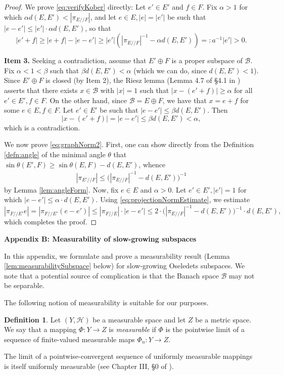 \documentclass[11pt]{amsart}
\theoremstyle{theorem}
\theoremstyle{definition}
\newtheorem{defn}[thm]{Definition}
\numberwithin{equation}{section}
\renewcommand{\a}{\alpha}
\newcommand{\Bc}{\mathcal{B}}
\newcommand{\ds}{/ \! /}
\begin{document}
\begin{proof}
We prove \eqref{eq:verifyKober} directly: Let $e' \in E'$ and $f \in F$.
Fix $\a > 1$ for which $\a d(E, E') < |\pi_{E \ds F}|$, and let $e \in E, |e|  = |e'|$ be 
such that $|e - e'| \leq |e'| \cdot  \a d(E, E')$, so that
\[
|e' + f| \geq |e + f| - |e - e'| \geq |e'| (|\pi_{E \ds F}|^{-1} - \a d(E, E')) =: a^{-1} |e'| > 0 .
\]

\smallskip \noindent
{\bf Item 3.} Seeking a contradiction, assume that $E' \oplus F$ is a proper subspace of $\Bc$. Fix $\a < 1 < \beta$ such that $\beta d(E, E') < \a$ (which we can do, since $d(E, E') < 1$). Since $E' \oplus F$ is closed (by Item 2), the Riesz lemma (Lemma 4.7 of \S 4.1 in \cite{S}) asserts that there exists $x \in \Bc$ with $|x|=1$ such that $|x -  (e' + f)| \geq \a$ for all $e' \in E', f \in F$. On the other hand, since $\Bc = E \oplus F$, we have that $x = e + f$ for some $e \in E, f \in F$. Let $e' \in E'$ be such that $|e - e'| \leq \beta d(E, E')$. Then
\[
|x - (e' + f)| = |e - e'| \leq \beta d(E, E') < \a,
\]
which is a contradiction.

We now prove \eqref{eq:graphNorm2}. First, one can show directly from the Definition \ref{defn:angle} of the minimal angle $\theta$ that $\sin \theta(E', F) \geq \sin \theta(E, F) - d(E, E')$, whence
\begin{align}\label{eq:projectionNormEstimate}
|\pi_{E' \ds F}| \leq \big( |\pi_{E \ds F}|^{-1} - d(E, E')\big)^{-1}
\end{align}
by Lemma \ref{lem:angleForm}. Now, fix $e \in E$ and $\a > 0$. Let $e' \in E', |e'| = 1$ for which $|e - e'| \leq \a \cdot d(E, E')$. Using \eqref{eq:projectionNormEstimate}, we estimate
\[
|\pi_{F \ds E'} e| = |\pi_{F \ds E'} (e - e')| \leq |\pi_{F \ds E}| \cdot |e - e'| \leq 2 \cdot \big( |\pi_{E \ds F}|^{-1} - d(E, E')\big)^{-1} \cdot d(E, E'),
\]
which completes the proof.
\end{proof}

\begin{center}
{\bf Appendix B: Measurability of slow-growing subspaces}
\end{center}

In this appendix, we formulate and prove a measurability result (Lemma \ref{lem:measurabilitySubspace} below) for slow-growing Oseledets subspaces. We note that a potential source of complication is that the Banach space $\Bc$ may not be separable.

\medskip

The following notion of measurability is suitable for our purposes.
\begin{defn}\label{defn:measurability}
Let $(Y, \mathcal H)$ be a measurable space and let $Z$ be a metric space. We say that a mapping $\Phi : Y \to Z$ is \emph{measurable} if $\Phi$ is the pointwise limit of a sequence of finite-valued measurable maps $\Phi_n : Y \to Z$.
\end{defn}
\noindent The limit of a pointwise-convergent sequence of uniformly measurable mappings is itself uniformly measurable (see Chapter III, \S 0 of \cite{castaing2006convex}).
\end{document}
